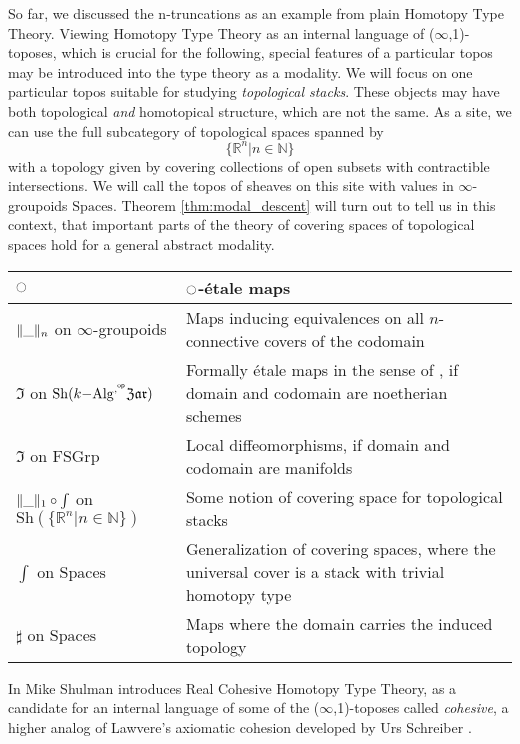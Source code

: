 \documentclass[9pt,twosided]{amsart}
\newcommand{\shape}{\int}
\newcommand{\NN}{\mathbb N}
\newcommand{\RR}{\mathbb R}
\newcommand{\Zar}{\ensuremath{\mathfrak{Zar}}}
\newcommand{\FSGrp}{\ensuremath{\mathrm{FSGrp}}}
\newcommand{\Spaces}{\ensuremath{\mathrm{Spaces}}}
\begin{document}
So far, we discussed the n-truncations as an example from plain Homotopy Type Theory.
Viewing Homotopy Type Theory as an internal language of ($\infty$,1)-toposes, 
which is crucial for the following,
special features of a particular topos may be introduced into the type theory as a modality.
We will focus on one particular topos suitable for studying \emph{topological stacks}.
These objects may have both topological \emph{and} homotopical structure, which are not the same.
As a site, we can use the full subcategory of topological spaces spanned by
\[ \{ \RR^n \vert n\in\NN\}\]
with a topology given by covering collections of open subsets with contractible intersections.
We will call the topos of sheaves on this site with values in $\infty$-groupoids $\Spaces$. 
Theorem \ref{thm:modal_descent} will turn out to tell us in this context, that important parts of the theory of covering spaces of topological spaces hold for a general abstract modality.

\begin{center}
  \begin{tabular}{p{5cm}p{7cm}}
    \toprule
    ${\ocircle}$ & ${\ocircle}$-étale maps  \\
    \midrule
    $\trunc{n}{\_}$ on $\infty$-groupoids & Maps inducing equivalences on all $n$-connective covers of the codomain \\
    $\Im$ on $\mathrm{Sh}(k\mathrm{-Alg}^\op ,\Zar)$ & Formally étale maps in the sense of \cite{GrothendieckDieudonne}, if domain and codomain are noetherian schemes   \\
    $\Im$ on $\FSGrp$ & Local diffeomorphisms, if domain and codomain are manifolds \\
    $\trunc{1}{\_}\circ\shape$ on $\mathrm{Sh}(\{\RR^n\vert n\in\NN\})$ & Some notion of covering space for topological stacks \\
    $\shape$ on $\Spaces$ & Generalization of covering spaces, where the universal cover is a stack with trivial homotopy type \\
    $\sharp$ on $\Spaces$ & Maps where the domain carries the induced topology \\
    \bottomrule
  \end{tabular}
\end{center}

In \cite{ShulmanRealCohesion} Mike Shulman introduces Real Cohesive Homotopy Type Theory, as a candidate for an internal language
of some of the ($\infty$,1)-toposes called \emph{cohesive}, a higher analog 
of Lawvere's axiomatic cohesion \cite{Lawvere07} developed by Urs Schreiber \cite{SchreiberDcct}.
\end{document}
